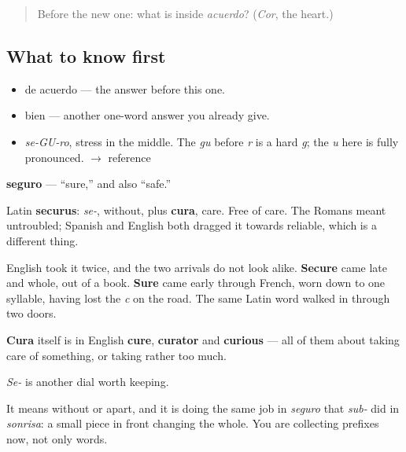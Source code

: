 \label{lesson:ES-C284-seguro}



\begin{quote}
Before the new one: what is inside \emph{acuerdo}? (\emph{Cor}, the heart.)
\end{quote}

\subsection*{What to know first}
\begin{itemize}
\raggedright
  \item de acuerdo — the answer before this one.
  \item bien — another one-word answer you already give.
\end{itemize}

\begin{sounds}
\begin{itemize}
\raggedright
  \item \emph{se-GU-ro}, stress in the middle. The \emph{gu} before \emph{r} is a hard \emph{g}; the \emph{u} here is fully pronounced. $\to$ reference
\end{itemize}
\end{sounds}

\begin{cousinweb}
\textbf{seguro} — \textquotedblleft{}sure,\textquotedblright{} and also \textquotedblleft{}safe.\textquotedblright{}

Latin \textbf{securus}: \emph{se-}, without, plus \textbf{cura}, care. Free of care. The Romans meant untroubled; Spanish and English both dragged it towards reliable, which is a different thing.

English took it twice, and the two arrivals do not look alike. \textbf{Secure} came late and whole, out of a book. \textbf{Sure} came early through French, worn down to one syllable, having lost the \emph{c} on the road. The same Latin word walked in through two doors.

\textbf{Cura} itself is in English \textbf{cure}, \textbf{curator} and \textbf{curious} — all of them about taking care of something, or taking rather too much.
\end{cousinweb}

\begin{grammarlens}[title={What you've built}]
\emph{Se-} is another dial worth keeping.

It means without or apart, and it is doing the same job in \emph{seguro} that \emph{sub-} did in \emph{sonrisa}: a small piece in front changing the whole. You are collecting prefixes now, not only words.
\end{grammarlens}

